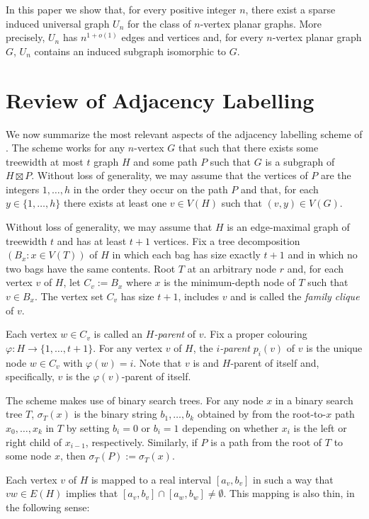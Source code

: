 \documentclass{patmorin}
\begin{document}
In this paper we show that, for every positive integer $n$, there exist a sparse induced universal graph $U_n$ for the class of $n$-vertex planar graphs.  More precisely, $U_n$ has $n^{1+o(1)}$ edges and vertices and, for every $n$-vertex planar graph $G$, $U_n$ contains an induced subgraph isomorphic to $G$.


\section{Review of Adjacency Labelling}
\label{review}

We now summarize the most relevant aspects of the adjacency labelling scheme of \citet{dujmovic.esperet.ea:adjacency}.  The scheme works for any $n$-vertex $G$ that such that there exists some treewidth at most $t$ graph $H$ and some path $P$ such that $G$ is a subgraph of $H\boxtimes P$. Without loss of generality, we may assume that the vertices of $P$ are the integers $1,\ldots,h$ in the order they occur on the path $P$ and that, for each $y\in\{1,\ldots,h\}$ there exists at least one $v\in V(H)$ such that $(v,y)\in V(G)$.

Without loss of generality, we may assume that $H$ is an edge-maximal graph of treewidth $t$ and has at least $t+1$ vertices.  Fix a tree decomposition $(B_x:x\in V(T))$ of $H$ in which each bag has size exactly $t+1$ and in which no two bags have the same contents.  Root $T$ at an arbitrary node $r$ and, for each vertex $v$ of $H$, let $C_v:=B_x$ where $x$ is the minimum-depth node of $T$ such that $v\in B_x$.  The vertex set $C_v$ has size $t+1$, includes $v$ and is called the \emph{family clique} of $v$.

Each vertex $w\in C_v$ is called an \emph{$H$-parent} of $v$.  Fix a proper colouring $\varphi:H\to\{1,\ldots,t+1\}$.  For any vertex $v$ of $H$, the \emph{$i$-parent} $p_i(v)$ of $v$ is the unique node $w\in C_v$ with $\varphi(w)=i$.  Note that $v$ is and $H$-parent of itself and, specifically, $v$ is the $\varphi(v)$-parent of itself.

The scheme makes use of binary search trees.  For any node $x$ in a binary search tree $T$, $\sigma_T(x)$ is the binary string $b_1,\ldots,b_k$ obtained by from the root-to-$x$ path $x_0,\ldots,x_k$ in $T$ by setting $b_i=0$ or $b_i=1$ depending on whether $x_i$ is the left or right child of $x_{i-1}$, respectively.  Similarly, if $P$ is a path from the root of $T$ to some node $x$, then $\sigma_T(P):=\sigma_T(x)$.

Each vertex $v$ of $H$ is mapped to a real interval $[a_v,b_v]$ in such a way that $vw\in E(H)$ implies that $[a_v,b_v]\cap [a_w,b_w]\neq\emptyset$.  This mapping is also thin, in the following sense:
\end{document}

